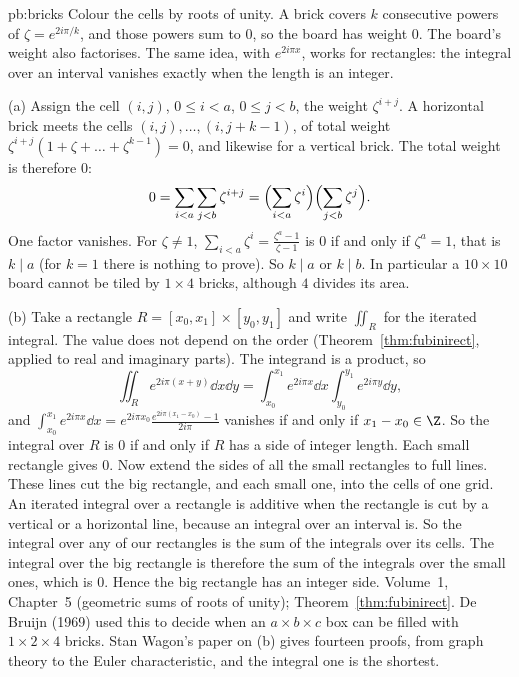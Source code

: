 \begin{solution}{pb:bricks}
\idea Colour the cells by roots of unity. A brick covers $k$ consecutive powers of $\zeta=e^{2i\pi/k}$, and those powers sum to $0$, so the board has weight $0$. The board's weight also factorises. The same idea, with $e^{2i\pi x}$, works for rectangles: the integral over an interval vanishes exactly when the length is an integer.

\writeup (a) Assign the cell $(i,j)$, $0\le i<a$, $0\le j<b$, the weight $\zeta^{i+j}$. A horizontal brick meets the cells
$(i,j),\dots,(i,j+k-1)$, of total weight $\zeta^{i+j}(1+\zeta+\dots+\zeta^{k-1})=0$, and likewise for a vertical brick. The total weight is therefore $0$:
\[
0=\sum_{i<a}\sum_{j<b}\zeta^{i+j}=\Bigl(\sum_{i<a}\zeta^i\Bigr)\Bigl(\sum_{j<b}\zeta^j\Bigr).
\]
One factor vanishes. For $\zeta\ne1$, $\sum_{i<a}\zeta^i=\frac{\zeta^a-1}{\zeta-1}$ is $0$ if and only if $\zeta^a=1$, that is
$k\mid a$ (for $k=1$ there is nothing to prove). So $k\mid a$ or $k\mid b$. In particular a $10\times10$ board cannot be tiled
by $1\times4$ bricks, although $4$ divides its area.

(b) Take a rectangle $R=[x_0,x_1]\times[y_0,y_1]$ and write $\iint_R$ for the iterated integral. The value does not depend on the order
(Theorem~\ref{thm:fubinirect}, applied to real and imaginary parts). The integrand is a product, so
\[
\iint_Re^{2i\pi(x+y)}\dd x\dd y=\int_{x_0}^{x_1}e^{2i\pi x}\dd x\int_{y_0}^{y_1}e^{2i\pi y}\dd y,
\]
and $\int_{x_0}^{x_1}e^{2i\pi x}\dd x=e^{2i\pi x_0}\frac{e^{2i\pi(x_1-x_0)}-1}{2i\pi}$ vanishes if and only if $x_1-x_0\in\Z$. So
the integral over $R$ is $0$ if and only if $R$ has a side of integer length. Each small rectangle gives $0$. Now extend the sides of
all the small rectangles to full lines. These lines cut the big rectangle, and each small one, into the cells of one grid.
An iterated integral over a rectangle is additive when the rectangle is cut by a vertical or a horizontal line, because an
integral over an interval is. So the integral over any of our rectangles is the sum of the integrals over its cells. The
integral over the big rectangle is therefore the sum of the integrals over the small ones, which is $0$. Hence the big
rectangle has an integer side.
\tools Volume~1, Chapter~5 (geometric sums of roots of unity); Theorem~\ref{thm:fubinirect}.
\leads De Bruijn (1969) used this to decide when an $a\times b\times c$ box can be filled with $1\times2\times4$ bricks.
Stan Wagon's paper on (b) gives fourteen proofs, from graph theory to the Euler characteristic, and the integral one is
the shortest.
\end{solution}

